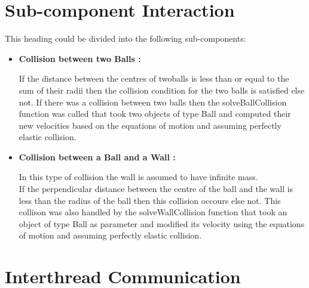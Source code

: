 \documentclass[]{article}
\begin{document}
\section{Sub-component Interaction}

\begin{flushleft}

This heading could be divided into the following sub-components:

\begin{itemize}


\item \textbf{Collision between two Balls :}\\


\begin{flushleft}

If the distance between the centres of twoballs is less than or equal to the sum of their radii then the collision condition for the two balls is satisfied else not. If there was a collision between two balls then the solveBallCollision function was called that took two objects of type Ball and computed their new velocities based on the equations of motion and assuming perfectly elastic collision.

\end{flushleft}


\item \textbf{Collision between a Ball and a Wall :} \\


\begin{flushleft}

In this type of collision the wall is assumed to have infinite mass.\\

If the perpendicular distance between the centre of the ball and the wall is less than the radius of the ball then this collision occours else not. This collison was also handled by the solveWallCollision function that took an object of type Ball as parameter and modified its velocity using the equations of motion and assuming perfectly elastic collision.

\end{flushleft}  

\end{itemize}

\end{flushleft}


\section{Interthread Communication}
\end{document}
